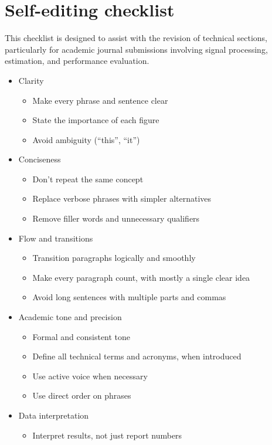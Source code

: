 \cleardoublepage
\section*{Self-editing checklist}

This checklist is designed to assist with the revision of technical sections, particularly for academic journal submissions involving signal processing, estimation, and performance evaluation.

\begin{itemize}
	\item Clarity
	\begin{itemize}
		\item Make every phrase and sentence clear
		\item State the importance of each figure
		\item Avoid ambiguity (``this'', ``it'')
	\end{itemize}
	\item Conciseness
	\begin{itemize}
		\item Don't repeat the same concept
		\item Replace verbose phrases with simpler alternatives
		\item Remove filler words and unnecessary qualifiers
	\end{itemize}
	\item Flow and transitions
	\begin{itemize}
		\item Transition paragraphs logically and smoothly
		\item Make every paragraph count, with mostly a single clear idea
		\item Avoid long sentences with multiple parts and commas
	\end{itemize}
	\item Academic tone and precision
	\begin{itemize}
		\item Formal and consistent tone
		\item Define all technical terms and acronyms, when introduced
		\item Use active voice when necessary
		\item Use direct order on phrases
	\end{itemize}
	\item Data interpretation
	\begin{itemize}
		\item Interpret results, not just report numbers

\end{itemize}
\end{itemize}
